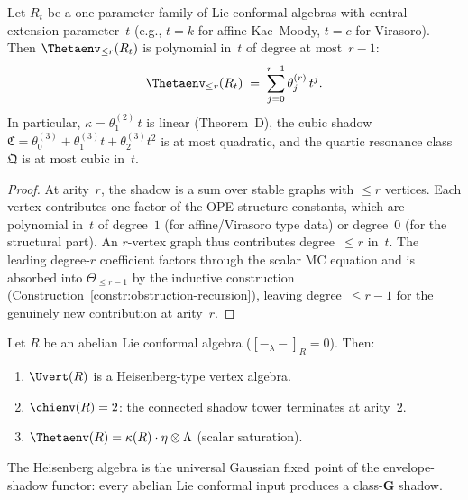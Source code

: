 \begin{proposition}
\label{prop:polynomial-level-dependence}
\ClaimStatusProvedHere
{}
Let $R_t$ be a one-parameter family of Lie conformal algebras
with central-extension parameter~$t$ \textup{(}e.g., $t = k$
for affine Kac--Moody, $t = c$ for Virasoro\textup{)}.
Then $\Thetaenv_{\leq r}(R_t)$ is polynomial in~$t$ of
degree at most~$r{-}1$:
\begin{equation}\label{eq:polynomial-level}
\Thetaenv_{\leq r}(R_t)
\;=\;
\sum_{j=0}^{r-1} \theta_j^{(r)} \, t^j.
\end{equation}
In particular, $\kappa = \theta_1^{(2)} \, t$ is linear
\textup{(}Theorem~D\textup{)}, the cubic shadow
$\mathfrak{C} = \theta_0^{(3)} + \theta_1^{(3)} t +
\theta_2^{(3)} t^2$ is at most quadratic, and the quartic
resonance class~$\mathfrak{Q}$ is at most cubic in~$t$.
\end{proposition}

\begin{proof}
At arity~$r$, the shadow is a sum over stable graphs with
$\leq r$ vertices.  Each vertex contributes one factor of the
OPE structure constants, which are polynomial in~$t$ of
degree~$1$ (for affine/Virasoro type data) or degree~$0$
(for the structural part).  An $r$-vertex graph thus
contributes degree~$\leq r$ in~$t$.  The leading degree-$r$
coefficient factors through the scalar MC equation and is
absorbed into $\Theta_{\leq r-1}$ by the inductive
construction
(Construction~\ref{constr:obstruction-recursion}),
leaving degree~$\leq r{-}1$ for the genuinely new contribution
at arity~$r$.
\end{proof}

\begin{proposition}
\label{prop:gaussian-collapse-abelian}
\ClaimStatusProvedHere
{}
Let $R$ be an abelian Lie conformal algebra
\textup{(}$[{-}_\lambda{-}]_R = 0$\textup{)}.  Then:
\begin{enumerate}[label=\textup{(\roman*)}]
\item $\Uvert(R)$ is a Heisenberg-type vertex algebra.
\item $\chienv(R) = 2$:
  the connected shadow tower terminates at arity~$2$.
\item $\Thetaenv(R) = \kappa(R) \cdot \eta \otimes \Lambda$
  \textup{(}scalar saturation\textup{)}.
\end{enumerate}
The Heisenberg algebra is the universal Gaussian fixed point
of the envelope-shadow functor: every abelian Lie conformal
input produces a class-$\mathbf{G}$ shadow.
\end{proposition}

